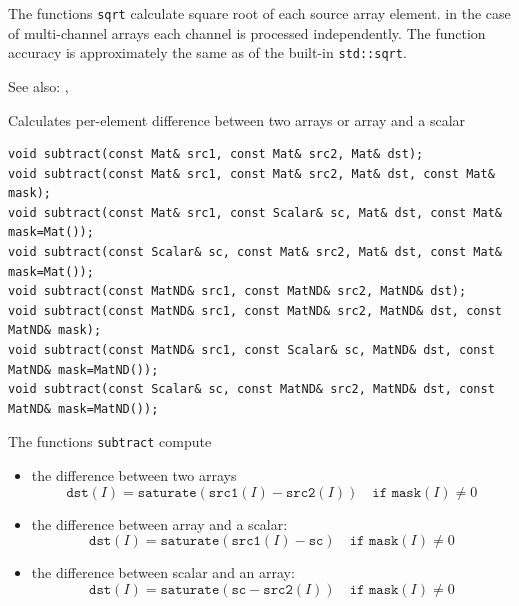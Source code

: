 The functions \texttt{sqrt} calculate square root of each source array element. in the case of multi-channel arrays each channel is processed independently. The function accuracy is approximately the same as of the built-in \texttt{std::sqrt}.

See also: , 

\label{subtract}
Calculates per-element difference between two arrays or array and a scalar

\begin{lstlisting}
void subtract(const Mat& src1, const Mat& src2, Mat& dst);
void subtract(const Mat& src1, const Mat& src2, Mat& dst, const Mat& mask);
void subtract(const Mat& src1, const Scalar& sc, Mat& dst, const Mat& mask=Mat());
void subtract(const Scalar& sc, const Mat& src2, Mat& dst, const Mat& mask=Mat());
void subtract(const MatND& src1, const MatND& src2, MatND& dst);
void subtract(const MatND& src1, const MatND& src2, MatND& dst, const MatND& mask);
void subtract(const MatND& src1, const Scalar& sc, MatND& dst, const MatND& mask=MatND());
void subtract(const Scalar& sc, const MatND& src2, MatND& dst, const MatND& mask=MatND());
\end{lstlisting}
\begin{description}
\end{description}

The functions \texttt{subtract} compute

\begin{itemize}
    \item the difference between two arrays
    \[\texttt{dst}(I) = \texttt{saturate}(\texttt{src1}(I) - \texttt{src2}(I))\quad\texttt{if mask}(I)\ne0\]
    \item the difference between array and a scalar:
    \[\texttt{dst}(I) = \texttt{saturate}(\texttt{src1}(I) - \texttt{sc})\quad\texttt{if mask}(I)\ne0\]
    \item the difference between scalar and an array:
    \[\texttt{dst}(I) = \texttt{saturate}(\texttt{sc} - \texttt{src2}(I))\quad\texttt{if mask}(I)\ne0\]
\end{itemize}

